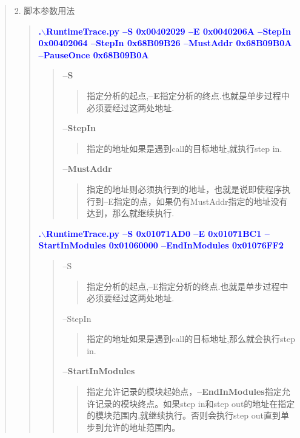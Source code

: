 \documentclass[AutoFakeBold,AutoFakeSlant]{article}
\begin{document}
\begin{flushleft}
\begin{quote}
			\large 
			2. 脚本参数用法 \\
			\begin{quote}
				\textcolor{blue}{ \textbf{ \Large
				.$\backslash$RuntimeTrace.py --S 0x00402029 --E 0x0040206A --StepIn 0x00402064 --StepIn 0x68B09B26 --MustAddr 0x68B09B0A --PauseOnce 0x68B09B0A }}\\
				\begin{quote}
					\textbf{--S}
					\begin{quote} 指定分析的起点,\textbf{--E}指定分析的终点.也就是单步过程中必须要经过这两处地址.
					\end{quote}
					\textbf{--StepIn} 
					\begin{quote}
						指定的地址如果是遇到call的目标地址,就执行step in.
					\end{quote}
					\textbf{--MustAddr}
					\begin{quote}
					 指定的地址则必须执行到的地址，也就是说即使程序执行到--E指定的点，如果仍有MustAddr指定的地址没有达到，那么就继续执行.
					\end{quote}
				\end{quote}
			
			\bigskip
			\bigskip
			
			\textcolor{blue}{ \textbf{ \Large
		    .$\backslash$RuntimeTrace.py --S 0x01071AD0 --E 0x01071BC1 --StartInModules 0x01060000 --EndInModules 0x01076FF2 }} \\
		    \begin{quote}
			    --S \begin{quote}指定分析的起点,--E指定分析的终点.也就是单步过程中必须要经过这两处地址.\end{quote}
			    --StepIn \begin{quote}指定的地址如果是遇到call的目标地址,那么就会执行step in.\end{quote}
			    \textbf{--StartInModules} \begin{quote}指定允许记录的模块起始点，\textbf{--EndInModules}指定允许记录的模块终点。如果step in和step out的地址在指定的模块范围内,就继续执行。否则会执行step out直到单步到允许的地址范围内。\end{quote}
			\end{quote}
		    
			\clearpage
		    

\end{quote}
\end{quote}
\end{flushleft}
\end{document}
